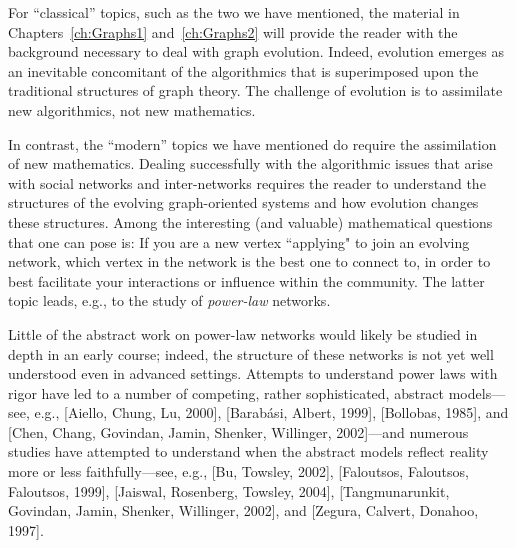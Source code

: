\medskip

For ``classical'' topics, such as the two we have mentioned, the material in Chapters~\ref{ch:Graphs1} and~\ref{ch:Graphs2} will provide the reader with the background necessary to deal with graph evolution.  Indeed, evolution emerges as an inevitable concomitant of the algorithmics that is superimposed upon the traditional structures of graph theory.  The challenge of evolution is to assimilate new algorithmics, not new mathematics.

\medskip


In contrast, the ``modern'' topics we have mentioned do require the assimilation of new 
mathematics.  Dealing successfully with the algorithmic issues that arise with social networks and inter-networks requires the reader to understand the structures of the evolving graph-oriented systems and how evolution changes these structures.  Among the interesting (and valuable) mathematical questions that one can pose is: If you are a new vertex ``applying" to join an evolving network, which vertex in the network is the best one to connect to, in order to best facilitate your interactions or influence within the community.  The latter topic leads, e.g., to the study of {\em power-law} networks.


\bigskip

\noindent {}
\bigskip

Little of the abstract work on power-law networks would likely be studied in depth in an early course; indeed, the structure of these networks is not yet well understood even in advanced settings.  Attempts to understand power laws with rigor have led to a number of competing, rather sophisticated, abstract models---see, e.g.,  [Aiello, Chung, Lu, 2000], [Barab\'{a}si, Albert, 1999], [Bollobas, 1985], and [Chen, Chang, Govindan, Jamin, Shenker, Willinger, 2002]---and numerous studies have attempted to understand when the abstract models reflect reality more or less faithfully---see, e.g., [Bu, Towsley, 2002], [Faloutsos, Faloutsos, Faloutsos, 1999], [Jaiswal, Rosenberg, Towsley, 2004], [Tangmunarunkit, Govindan, Jamin, Shenker, Willinger, 2002], and [Zegura, Calvert, Donahoo, 1997].

